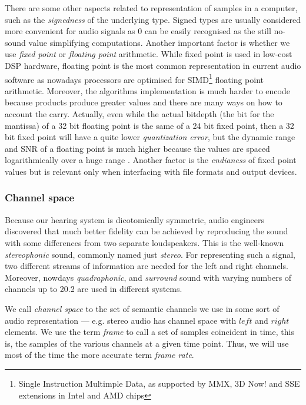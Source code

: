There are some other aspects related to representation of samples in a
computer, such as the \emph{signedness} of the underlying type. Signed
types are usually considered more convenient for audio signals as 0
can be easily recognised as the still no-sound value simplifying
computations. Another important factor is whether we use \emph{fixed
  point} or \emph{floating point} arithmetic. While fixed point is
used in low-cost DSP hardware, floating point is the most common
representation in current audio software as nowadays processors are
optimised for SIMD\footnote{Single Instruction Multimple Data, as
  supported by MMX, 3D Now! and SSE extensions in Intel and AMD chips}
floating point arithmetic. Moreover, the algorithms implementation is
much harder to encode because products produce greater values and
there are many ways on how to account the carry.  Actually, even while
the actual bitdepth (the bit for the mantissa) of a 32 bit floating
point is the same of a 24 bit fixed point, then a 32 bit fixed point
will have a quite lower \emph{quantization error}, but the dynamic
range and SNR of a floating point is much higher because the
values are spaced logarithmically over a huge range
\cite{smith02dsp}. Another factor is the \emph{endianess} of fixed
point values but is relevant only when interfacing with file formats
and output devices.

\subsubsection{Channel space}

Because our hearing system is dicotomically symmetric, audio engineers
discovered that much better fidelity can be achieved by reproducing
the sound with some differences from two separate loudspeakers. This
is the well-known \emph{stereophonic} sound, commonly named just
\emph{stereo}. For representing such a signal, two different streams
of information are needed for the left and right channels. Moreover,
nowdays \emph{quadraphonic}, and \emph{surround} sound with varying
numbers of channels up to 20.2 are used in different systems.

We call \emph{channel space} to the set of semantic channels we use in
some sort of audio representation --- e.g. stereo audio has channel
space with $left$ and $right$ elements. We use the term
\emph{frame} to call a set of samples coincident in time, this is, the
samples of the various channels at a given time point. Thus, we will
use most of the time the more accurate term \emph{frame rate}.

